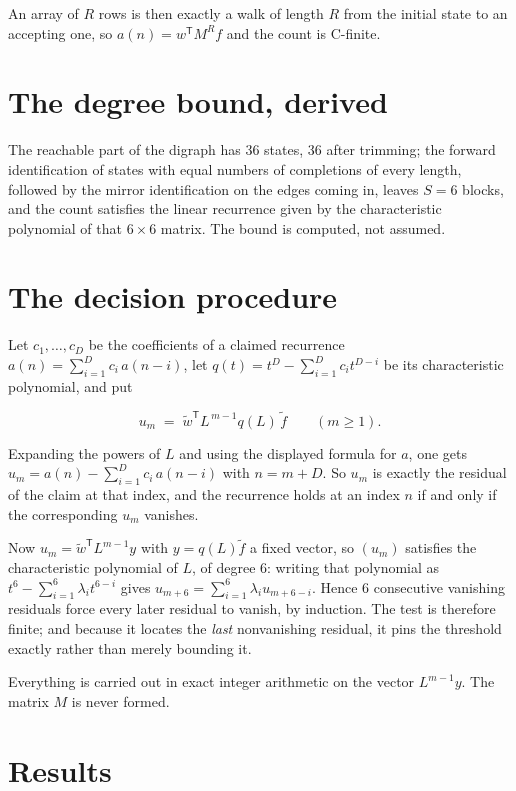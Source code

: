 \documentclass[11pt]{article}
\theoremstyle{definition}
\begin{document}
An array of $R$ rows is then exactly a walk of length $R$ from the initial state to an accepting one, so $a(n) = w^{\mathsf T}M^{R}f$ and the count is C-finite.

\section{The degree bound, derived}

The reachable part of the digraph has $36$ states, $36$ after trimming; the forward identification of states with equal numbers of completions of every length, followed by the mirror identification on the edges coming in, leaves $S = 6$ blocks, and the count satisfies the linear recurrence given by the characteristic polynomial of that $6\times6$ matrix. The bound is computed, not assumed.

\section{The decision procedure}

Let $c_1,\dots,c_D$ be the coefficients of a claimed recurrence $a(n) = \sum_{i=1}^{D} c_i\,a(n-i)$, let $q(t) = t^{D} - \sum_{i=1}^{D} c_i t^{D-i}$ be its characteristic polynomial, and put

\[u_m \;=\; \tilde w^{\mathsf T} L^{\,m-1} q(L)\,\tilde f \qquad (m \ge 1).\]

Expanding the powers of $L$ and using the displayed formula for $a$, one gets $u_m = a(n) - \sum_{i=1}^{D} c_i\,a(n-i)$ with $n = m + D$. So $u_m$ is exactly the residual of the claim at that index, and the recurrence holds at an index $n$ if and only if the corresponding $u_m$ vanishes.

Now $u_m = \tilde w^{\mathsf T} L^{m-1} y$ with $y = q(L)\tilde f$ a fixed vector, so $(u_m)$ satisfies the characteristic polynomial of $L$, of degree $6$: writing that polynomial as $t^{6} - \sum_{i=1}^{6} \lambda_i t^{6-i}$ gives $u_{m+6} = \sum_{i=1}^{6} \lambda_i u_{m+6-i}$. Hence $6$ consecutive vanishing residuals force every later residual to vanish, by induction. The test is therefore finite; and because it locates the {\itshape last} nonvanishing residual, it pins the threshold exactly rather than merely bounding it.

Everything is carried out in exact integer arithmetic on the vector $L^{m-1}y$. The matrix $M$ is never formed.

\section{Results}
\end{document}
